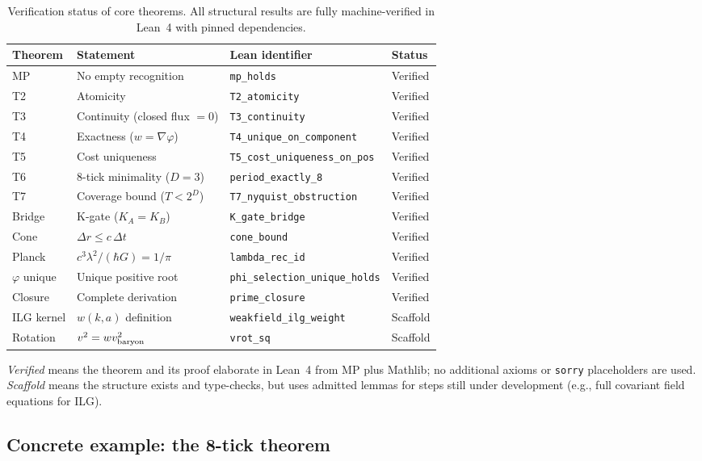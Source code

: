 \documentclass[11pt]{article}
\begin{document}
\begin{table}[htbp]
\centering
\caption{Verification status of core theorems. All structural results are fully machine-verified in Lean~4 with pinned dependencies.}
\label{tab:verification-status}
\begin{tabular}{l l p{4cm} l}
\hline\hline
\textbf{Theorem} & \textbf{Statement} & \textbf{Lean identifier} & \textbf{Status} \\
\hline
MP & No empty recognition & \texttt{mp\_holds} & Verified \\
T2 & Atomicity & \texttt{T2\_atomicity} & Verified \\
T3 & Continuity (closed flux $=0$) & \texttt{T3\_continuity} & Verified \\
T4 & Exactness ($w=\nabla\varphi$) & \texttt{T4\_unique\_on\_component} & Verified \\
T5 & Cost uniqueness & \texttt{T5\_cost\_uniqueness\_on\_pos} & Verified \\
T6 & 8-tick minimality ($D=3$) & \texttt{period\_exactly\_8} & Verified \\
T7 & Coverage bound ($T<2^D$) & \texttt{T7\_nyquist\_obstruction} & Verified \\
Bridge & K-gate ($K_A=K_B$) & \texttt{K\_gate\_bridge} & Verified \\
Cone & $\Delta r \le c\,\Delta t$ & \texttt{cone\_bound} & Verified \\
Planck & $c^3\lambda^2/(\hbar G)=1/\pi$ & \texttt{lambda\_rec\_id} & Verified \\
$\varphi$ unique & Unique positive root & \texttt{phi\_selection\_unique\_holds} & Verified \\
Closure & Complete derivation & \texttt{prime\_closure} & Verified \\
\hline
ILG kernel & $w(k,a)$ definition & \texttt{weakfield\_ilg\_weight} & Scaffold \\
Rotation & $v^2=wv_{\rm baryon}^2$ & \texttt{vrot\_sq} & Scaffold \\
\hline\hline
\end{tabular}
\end{table}

\noindent\emph{Verified} means the theorem and its proof elaborate in Lean~4 from MP plus Mathlib; no additional axioms or \texttt{sorry} placeholders are used. \emph{Scaffold} means the structure exists and type-checks, but uses admitted lemmas for steps still under development (e.g., full covariant field equations for ILG).

\subsection{Concrete example: the 8-tick theorem}
\end{document}
